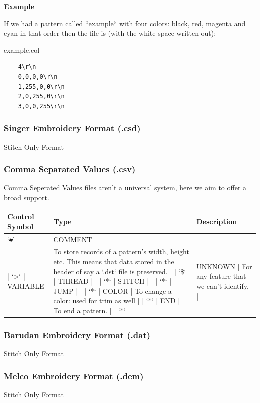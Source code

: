 \documentclass[a4paper, 11pt]{report}
\begin{document}
\begin{flushleft}
\textbf{Example}
\end{flushleft}

If we had a pattern called ``example`` with four colors: black, red, magenta and 
cyan in that order then the file is (with the white space written out):

example.col

\begin{verbatim}
    4\r\n
    0,0,0,0\r\n
    1,255,0,0\r\n
    2,0,255,0\r\n
    3,0,0,255\r\n
\end{verbatim}

\subsubsection{Singer Embroidery Format (.csd)}

Stitch Only Format

\subsubsection{Comma Separated Values (.csv)}

Comma Seperated Values files aren't a universal system, here we aim to
offer a broad support.

\begin{tabular}{l l l}
Control Symbol & Type & Description \\
\hline
`\texttt{\#}' & COMMENT & \\
| `>` | VARIABLE & To store records of a pattern's width, height etc. This means that data stored in the header of say a `.dst` file is preserved. |
| `\$` | THREAD | |
| `*` | STITCH | |
| `*` | JUMP | |
| `*` | COLOR | To change a color: used for trim as well |
| `*` | END | To end a pattern. |
| `*` & UNKNOWN | For any feature that we can't identify. |
\end{tabular}

\subsubsection{Barudan Embroidery Format (.dat)}

Stitch Only Format

\subsubsection{Melco Embroidery Format (.dem)}

Stitch Only Format
\end{document}
